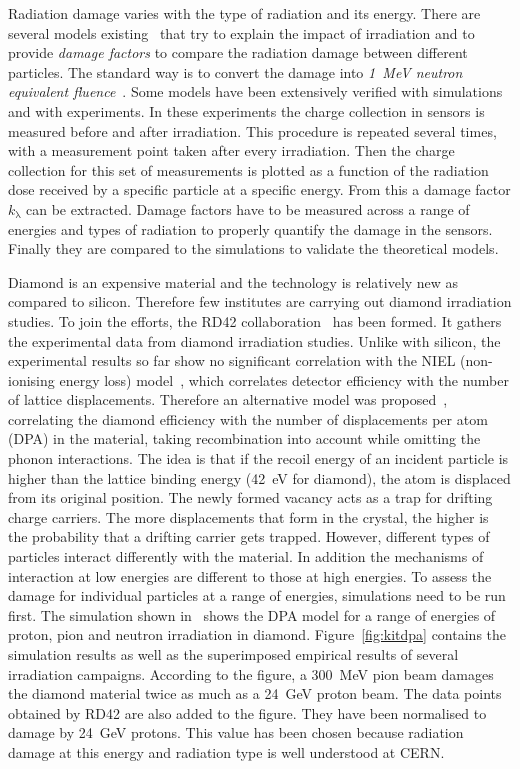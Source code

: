 Radiation damage varies with the type of radiation and its energy. There are several models existing~\cite{2002NIMPA,Guthoff:2014223} that try to explain the impact of irradiation and to provide \emph{damage factors} to compare the radiation damage between different particles. The standard way is to convert the damage into \emph{1~MeV neutron equivalent fluence}~\cite{NEQ:00000}. Some models have been extensively verified with simulations and with experiments. In these experiments the charge collection in sensors is measured before and after irradiation. This procedure is repeated several times, with a measurement point taken after every irradiation. Then the charge collection for this set of measurements is plotted as a function of the radiation dose received by a specific particle at a specific energy. From this a damage factor $k_\mathrm{\lambda}$ can be extracted. Damage factors have to be measured across a range of energies and types of radiation to properly quantify the damage in the sensors. Finally they are compared to the simulations to validate the theoretical models.

Diamond is an expensive material and the technology is relatively new as compared to silicon. Therefore few institutes are carrying out diamond irradiation studies. To join the efforts, the RD42 collaboration~\cite{RD42:00000} has been formed. It gathers the experimental data from diamond irradiation studies. Unlike with silicon, the experimental results so far show no significant correlation with the NIEL (non-ionising energy loss) model~\cite{2002NIMPA}, which correlates detector efficiency with the number of lattice displacements. Therefore an alternative model was proposed~\cite{Guthoff:2014223}, correlating the diamond efficiency with the number of displacements per atom (DPA) in the material, taking recombination into account while omitting the phonon interactions. The idea is that if the recoil energy of an incident particle is higher than the lattice binding energy (42~eV for diamond), the atom is displaced from its original position. The newly formed vacancy acts as a trap for drifting charge carriers. The more displacements that form in the crystal, the higher is the probability that a drifting carrier gets trapped. However, different types of particles interact differently with the material. In addition the mechanisms of interaction at low energies are different to those at high energies. To assess the damage for individual particles at a range of energies, simulations need to be run first. The simulation shown in~\cite{Guthoff:2014223} shows the DPA model for a range of energies of proton, pion and neutron irradiation in diamond. Figure~\ref{fig:kitdpa}  contains the simulation results as well as the superimposed empirical results of several irradiation campaigns. According to the figure, a 300~MeV pion beam damages the diamond material twice as much as a 24~GeV proton beam. The data points obtained by RD42 are also added to the figure. They have been normalised to damage by 24~GeV protons. This value has been chosen because radiation damage at this energy and radiation type is well understood at CERN.

